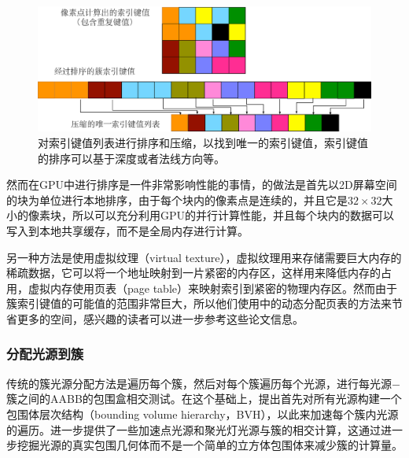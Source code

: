 \begin{figure}
\begin{center}
	\includegraphics[width=\textwidth]{figures/shade/sorted-key}
\end{center}
	\caption{对索引键值列表进行排序和压缩，以找到唯一的索引键值，索引键值的排序可以基于深度或者法线方向等。}
	\label{f:shade-sorted-key}
\end{figure}

然而在GPU中进行排序是一件非常影响性能的事情，\cite{a:ClusteredDeferredandForwardShading}的做法是首先以2D屏幕空间的块为单位进行本地排序，由于每个块内的像素点是连续的，并且它是$32\times 32$大小的像素块，所以可以充分利用GPU的并行计算性能，并且每个块内的数据可以写入到本地共享缓存，而不是全局内存进行计算。

另一种方法是使用虚拟纹理\cite{a:VirtualTexturing}（virtual texture），虚拟纹理用来存储需要巨大内存的稀疏数据，它可以将一个地址映射到一片紧密的内存区，这样用来降低内存的占用，虚拟内存使用页表（page table）来映射索引到紧密的物理内存区。然而由于簇索引键值的可能值的范围非常巨大，所以他们使用\cite{a:Glift:GenericEfficientRandom-AccessGPUDataStructures}中的动态分配页表的方法来节省更多的空间，感兴趣的读者可以进一步参考这些论文信息。






\subsubsection{分配光源到簇}
传统的簇光源分配方法是遍历每个簇，然后对每个簇遍历每个光源，进行每光源$-$簇之间的AABB的包围盒相交测试。在这个基础上，\cite{a:ClusteredDeferredandForwardShading}提出首先对所有光源构建一个包围体层次结构（bounding volume hierarchy，BVH），以此来加速每个簇内光源的遍历。\cite{a:PracticalClusteredShading}进一步提供了一些加速点光源和聚光灯光源与簇的相交计算，这通过进一步挖掘光源的真实包围几何体而不是一个简单的立方体包围体来减少簇的计算量。

